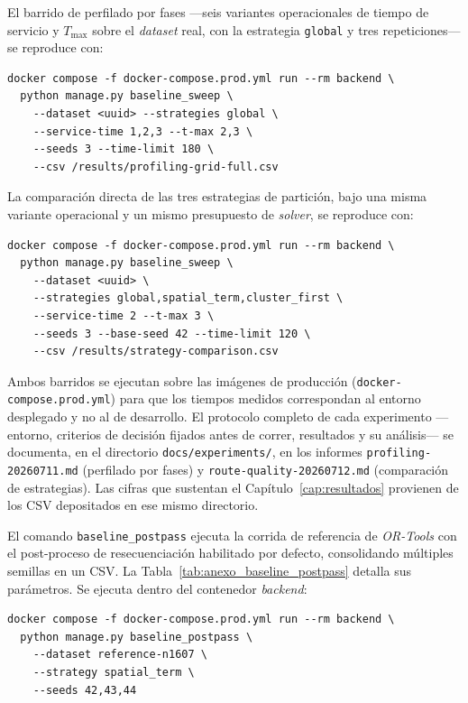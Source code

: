 El barrido de perfilado por fases ---seis variantes operacionales de tiempo de
servicio y $T_{\max}$ sobre el \textit{dataset} real, con la estrategia \texttt{global}
y tres repeticiones--- se reproduce con:

\begin{verbatim}
docker compose -f docker-compose.prod.yml run --rm backend \
  python manage.py baseline_sweep \
    --dataset <uuid> --strategies global \
    --service-time 1,2,3 --t-max 2,3 \
    --seeds 3 --time-limit 180 \
    --csv /results/profiling-grid-full.csv
\end{verbatim}

La comparación directa de las tres estrategias de partición, bajo una misma
variante operacional y un mismo presupuesto de \textit{solver}, se reproduce con:

\begin{verbatim}
docker compose -f docker-compose.prod.yml run --rm backend \
  python manage.py baseline_sweep \
    --dataset <uuid> \
    --strategies global,spatial_term,cluster_first \
    --service-time 2 --t-max 3 \
    --seeds 3 --base-seed 42 --time-limit 120 \
    --csv /results/strategy-comparison.csv
\end{verbatim}

\begin{sloppypar}
Ambos barridos se ejecutan sobre las imágenes de producción
(\texttt{docker-compose.prod.yml}) para que los tiempos medidos correspondan al
entorno desplegado y no al de desarrollo. El protocolo completo de cada experimento
---entorno, criterios de decisión fijados antes de correr, resultados y su análisis---
se documenta, en el directorio \texttt{docs\slash experiments\slash }, en los informes
\texttt{profiling-20260711.md} (perfilado por fases) y
\texttt{route-quality-20260712.md} (comparación de estrategias). Las cifras que
sustentan el Capítulo~\ref{cap:resultados} provienen de los CSV depositados en ese
mismo directorio.
\end{sloppypar}

El comando \texttt{baseline\_postpass} ejecuta la corrida de referencia de
\textit{OR-Tools} con el post-proceso de resecuenciación habilitado por defecto,
consolidando múltiples semillas en un CSV. La
Tabla~\ref{tab:anexo_baseline_postpass} detalla sus parámetros. Se ejecuta dentro
del contenedor \textit{backend}:

\begin{verbatim}
docker compose -f docker-compose.prod.yml run --rm backend \
  python manage.py baseline_postpass \
    --dataset reference-n1607 \
    --strategy spatial_term \
    --seeds 42,43,44
\end{verbatim}

